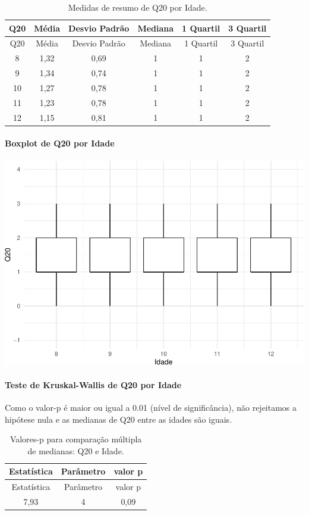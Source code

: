 \documentclass[]{article}
\let\oldparagraph\paragraph
\renewcommand{\paragraph}[1]{\oldparagraph{#1}\mbox{}}
\begin{document}
\begin{longtable}[]{@{}cccccc@{}}
\caption{\label{tab:unnamed-chunk-391}Medidas de resumo de Q20 por Idade.}\tabularnewline
\toprule
Q20 & Média & Desvio Padrão & Mediana & 1 Quartil & 3 Quartil\tabularnewline
\midrule
\endfirsthead
\toprule
Q20 & Média & Desvio Padrão & Mediana & 1 Quartil & 3 Quartil\tabularnewline
\midrule
\endhead
8 & 1,32 & 0,69 & 1 & 1 & 2\tabularnewline
9 & 1,34 & 0,74 & 1 & 1 & 2\tabularnewline
10 & 1,27 & 0,78 & 1 & 1 & 2\tabularnewline
11 & 1,23 & 0,78 & 1 & 1 & 2\tabularnewline
12 & 1,15 & 0,81 & 1 & 1 & 2\tabularnewline
\bottomrule
\end{longtable}

\hypertarget{boxplot-de-q20-por-idade}{%
\paragraph{Boxplot de Q20 por Idade}\label{boxplot-de-q20-por-idade}}

\begin{center}\includegraphics[width=0.75\linewidth]{relatorio_covid19_files/figure-latex/unnamed-chunk-392-1} \end{center}

\hypertarget{teste-de-kruskal-wallis-de-q20-por-idade}{%
\paragraph{Teste de Kruskal-Wallis de Q20 por Idade}\label{teste-de-kruskal-wallis-de-q20-por-idade}}

Como o valor-p é maior ou igual a 0.01 (nível de significância), não rejeitamos a hipótese nula e as medianas de Q20 entre as idades são iguais.

\begin{longtable}[]{@{}ccc@{}}
\caption{\label{tab:unnamed-chunk-394}Valores-p para comparação múltipla de medianas: Q20 e Idade.}\tabularnewline
\toprule
Estatística & Parâmetro & valor p\tabularnewline
\midrule
\endfirsthead
\toprule
Estatística & Parâmetro & valor p\tabularnewline
\midrule
\endhead
7,93 & 4 & 0,09\tabularnewline
\bottomrule
\end{longtable}
\end{document}
